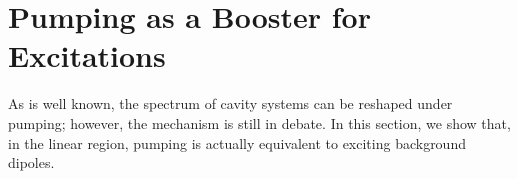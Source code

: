 







\section[Pumping Effect]{Pumping as a Booster for Excitations}\label{PumpingComparison}
As is well known, the spectrum of cavity systems can be reshaped under pumping; however, the mechanism is still in debate. In this section, we show that, in the linear region, pumping is actually equivalent to exciting background dipoles.

